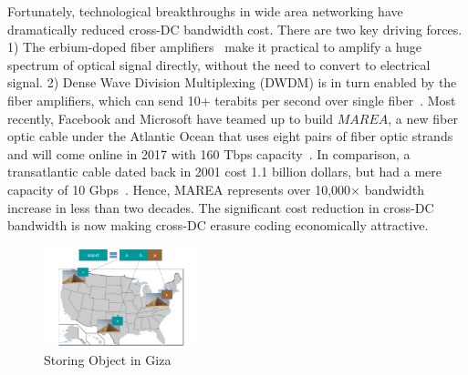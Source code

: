 Fortunately, technological breakthroughs in wide area networking have dramatically reduced cross-DC bandwidth cost.
There are two key driving forces. 1) The erbium-doped fiber
amplifiers~\cite{mears1986low} make it practical to amplify a huge spectrum of
optical signal directly, without the need to convert to electrical signal.
2) Dense Wave Division Multiplexing (DWDM) is in turn enabled by the fiber
amplifiers, which can send 10+ terabits per second over single fiber~\cite{zhu2011112}.
Most recently, Facebook and Microsoft have teamed up to build $MAREA$, a new
fiber optic cable under the Atlantic Ocean that uses eight pairs of fiber optic
strands and will come online in 2017 with 160 Tbps capacity~\cite{bib:MAREA1, bib:MAREA2}.
In comparison, a transatlantic cable dated back in 2001 cost 1.1 billion dollars,
but had a mere capacity of 10 Gbps~\cite{bib:FA-1}.
Hence, MAREA represents over 10,000$\times$ bandwidth increase in less than two decades.
The significant cost reduction in cross-DC bandwidth is now
making cross-DC erasure coding economically attractive.


\begin{figure}[tp]
\centering
\includegraphics[width=0.4\textwidth]{images/giza_example_crop_fit}
\caption{Storing Object in Giza}
\label{fig:giza_example}
\end{figure}


